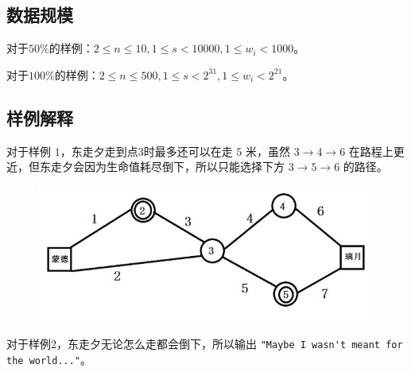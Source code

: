 \subsection*{数据规模}

对于$50 \%$的样例：$2 \leq n \leq 10,1\leq s < 10000,1 \leq w_i < 1000$。

对于$100 \%$的样例：$2 \leq n \leq 500,1\leq s < 2^{31},1 \leq w_i < 2^{21}$。

\subsection*{样例解释}

对于样例 $1$，东走夕走到点3时最多还可以在走 $5$ 米，虽然 $3 \rightarrow 4 \rightarrow 6$ 在路程上更近，但东走夕会因为生命值耗尽倒下，所以只能选择下方 $3 \rightarrow 5 \rightarrow 6$ 的路径。

\begin{figure}[H]
    \centering
    \includegraphics[scale=0.6]{./src/Problem-H-1.png}
\end{figure}

对于样例2，东走夕无论怎么走都会倒下，所以输出 \lstinline|"Maybe I wasn't meant for the world..."|。